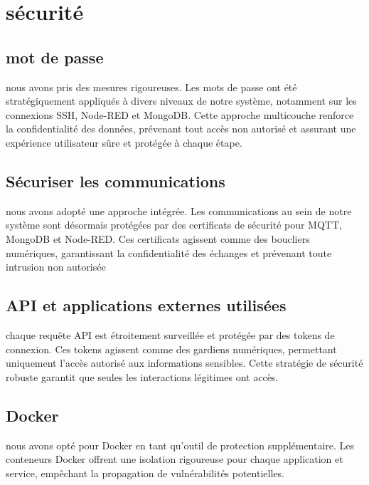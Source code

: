 \chapter{sécurité}
\section{mot de passe}

 nous avons pris des mesures rigoureuses. Les mots de passe ont été stratégiquement appliqués à divers niveaux de notre système, notamment sur les connexions SSH, Node-RED et MongoDB. Cette approche multicouche renforce la confidentialité des données, prévenant tout accès non autorisé et assurant une expérience utilisateur sûre et protégée à chaque étape.
 
\section{Sécuriser les communications}

nous avons adopté une approche intégrée. Les communications au sein de notre système sont désormais protégées par des certificats de sécurité pour MQTT, MongoDB et Node-RED. Ces certificats agissent comme des boucliers numériques, garantissant la confidentialité des échanges et prévenant toute intrusion non autorisée


\section{API et applications externes utilisées}

chaque requête API est étroitement surveillée et protégée par des tokens de connexion. Ces tokens agissent comme des gardiens numériques, permettant uniquement l'accès autorisé aux informations sensibles. Cette stratégie de sécurité robuste garantit que seules les interactions légitimes ont accès.

\section{Docker}

 nous avons opté pour Docker en tant qu'outil de protection supplémentaire. Les conteneurs Docker offrent une isolation rigoureuse pour chaque application et service, empêchant la propagation de vulnérabilités potentielles.